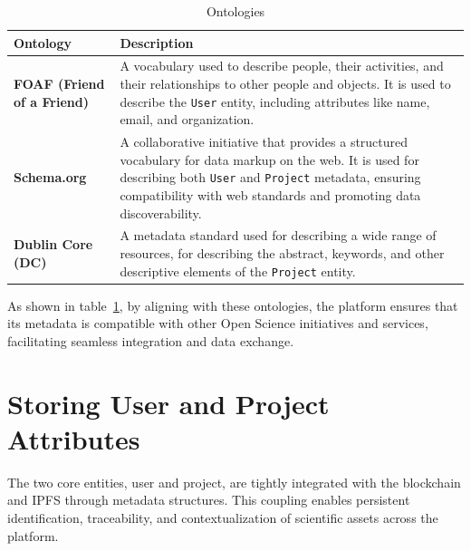 \documentclass[final]{rc-book-2.14}
\begin{document}
\begin{table}[h]
    \centering
    \renewcommand{\arraystretch}{1.2}
    \begin{tabularx}{\textwidth}{|l|X|}            \hline
        \textbf{Ontology}                  & \textbf{Description}                                                                                                                                                                                                                                   \\ \hline
        \textbf{FOAF (Friend of a Friend)} & A vocabulary used to describe people, their activities, and their relationships to other people and objects. It is used to describe the \texttt{User} entity, including attributes like name, email, and organization.                                 \\ \hline
        \textbf{Schema.org}                & A collaborative initiative that provides a structured vocabulary for data markup on the web. It is used for describing both \texttt{User} and \texttt{Project} metadata, ensuring compatibility with web standards and promoting data discoverability. \\ \hline
        \textbf{Dublin Core (DC)}          & A metadata standard used for describing a wide range of resources, for describing the abstract, keywords, and other descriptive elements of the \texttt{Project} entity.                                                                               \\ \hline
    \end{tabularx}
    \caption{Ontologies}
    \label{tab:ontologies}
\end{table}


As shown in table~\ref{tab:ontologies}, by aligning with these ontologies, the platform ensures that its metadata is compatible with other Open Science initiatives and services, facilitating seamless integration and data exchange.

\section{Storing User and Project Attributes}
\label{chp:proposed_model:sec:metadata}

The two core entities, user and project, are tightly integrated with the blockchain and IPFS through metadata structures. This coupling enables persistent identification, traceability, and contextualization of scientific assets across the platform.
\end{document}
